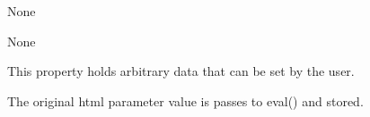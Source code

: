 \documentclass[letterpaper,10pt,english]{sphinxmanual}
\begin{document}
\begin{fulllineitems}
\begin{fulllineitems}
\end{fulllineitems}


\begin{fulllineitems}
\label{api:qwt.Chart.span}
None

\end{fulllineitems}


\begin{fulllineitems}
\label{api:qwt.Chart.update}
None

\end{fulllineitems}


\begin{fulllineitems}
\label{api:qwt.Chart.user}
This property holds arbitrary data that can be set by the user.

The original html parameter value is passes to eval() and stored.

\end{fulllineitems}


\end{fulllineitems}

\end{document}
